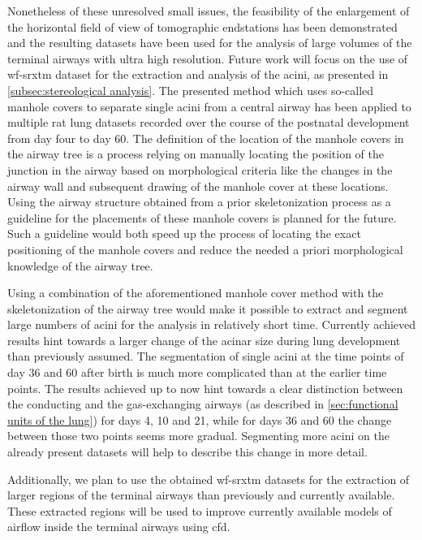 Nonetheless of these unresolved small issues, the feasibility of the enlargement of the horizontal field of view of tomographic endstations has been demonstrated and the resulting datasets have been used for the analysis of large volumes of the terminal airways with ultra high resolution. Future work will focus on the use of \ac{wf-srxtm} dataset for the extraction and analysis of the acini, as presented in \autoref{subsec:stereological analysis}. The presented method which uses so-called manhole covers to separate single acini from a central airway has been applied to multiple rat lung datasets recorded over the course of the postnatal development from day four to day 60. The definition of the location of the manhole covers in the airway tree is a process relying on manually locating the position of the junction in the airway based on morphological criteria like the changes in the airway wall and subsequent drawing of the manhole cover at these locations. Using the airway structure obtained from a prior skeletonization process as a guideline for the placements of these manhole covers is planned for the future. Such a guideline would both speed up the process of locating the exact positioning of the manhole covers and reduce the needed a priori morphological knowledge of the airway tree.

Using a combination of the aforementioned manhole cover method with the skeletonization of the airway tree would make it possible to extract and segment large numbers of acini for the analysis in relatively short time. Currently achieved results hint towards a larger change of the acinar size during lung development than previously assumed. The segmentation of single acini at the time points of day 36 and 60 after birth is much more complicated than at the earlier time points. The results achieved up to now hint towards a clear distinction between the conducting and the gas-exchanging airways (as described in \autoref{sec:functional units of the lung}) for days 4, 10 and 21, while for days 36 and 60 the change between those two points seems more gradual. Segmenting more acini on the already present datasets will help to describe this change in more detail. 

Additionally, we plan to use the obtained \ac{wf-srxtm} datasets for the extraction of larger regions of the terminal airways than previously and currently available. These extracted regions will be used to improve currently available models of airflow inside the terminal airways \cite{Sznitman2007,Sznitman2009} using \ac{cfd}. 

